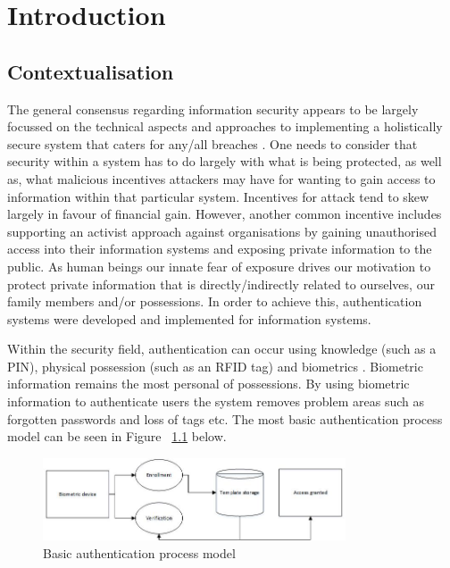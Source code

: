 
\chapter{Introduction}  %

\ifpdf
    \graphicspath{{Chapter1/Figs/Raster/}{Chapter1/Figs/PDF/}{Chapter1/Figs/}}
\else
    \graphicspath{{Chapter1/Figs/Vector/}{Chapter1/Figs/}}
\fi


\section{Contextualisation} %

The general consensus regarding information security appears to be largely focussed on the technical aspects and approaches to implementing a holistically secure system that caters for any/all breaches \cite{Anderson2001}. One needs to consider that security within a system has to do largely with what is being protected, as well as, what malicious incentives attackers may have for wanting to gain access to information within that particular system. Incentives for attack tend to skew largely in favour of financial gain. However, another common incentive includes supporting an activist approach against organisations by gaining unauthorised access into their information systems and exposing private information to the public. As human beings our innate fear of exposure drives our motivation to protect private information that is directly/indirectly related to ourselves, our family members and/or possessions. In order to achieve this, authentication systems were developed and implemented for information systems. 

Within the security field, authentication can occur using knowledge (such as a PIN), physical possession (such as an RFID tag) and biometrics \cite{Liu2001}. Biometric information remains the most personal of possessions. By using biometric information to authenticate users the system removes problem areas such as forgotten passwords and loss of tags etc. The most basic authentication process model can be seen in Figure ~\ref{fig:basic_authentication_process_model} below.
\begin{figure}[hbtp]

\centering
\includegraphics[width=0.8\textwidth]{Chapter1/Figs/Figure1.jpg}
\caption{ Basic authentication process model}
\label{fig:basic_authentication_process_model}
\end{figure}

